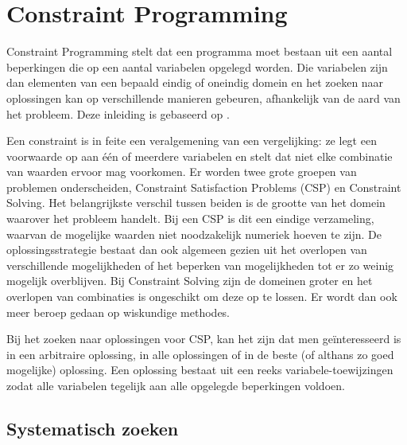 \section{Constraint Programming}

Constraint Programming stelt dat een programma moet bestaan uit een aantal beperkingen die op een aantal variabelen opgelegd worden. Die variabelen zijn dan elementen van een bepaald eindig of oneindig domein en het zoeken naar oplossingen kan op verschillende manieren gebeuren, afhankelijk van de aard van het probleem. Deze inleiding is gebaseerd op \cite{bartak99constraint}.

Een constraint is in feite een veralgemening van een vergelijking: ze legt een voorwaarde op aan \'e\'en of meerdere variabelen en stelt dat niet elke combinatie van waarden ervoor mag voorkomen. Er worden twee grote groepen van problemen onderscheiden, Constraint Satisfaction Problems (CSP) en Constraint Solving. Het belangrijkste verschil tussen beiden is de grootte van het domein waarover het probleem handelt. Bij een CSP is dit een eindige verzameling, waarvan de mogelijke waarden niet noodzakelijk numeriek hoeven te zijn. De oplossingsstrategie bestaat dan ook algemeen gezien uit het overlopen van verschillende mogelijkheden of het beperken van mogelijkheden tot er zo weinig mogelijk overblijven. Bij Constraint Solving zijn de domeinen groter en het overlopen van combinaties is ongeschikt om deze op te lossen. Er wordt dan ook meer beroep gedaan op wiskundige methodes.

Bij het zoeken naar oplossingen voor CSP, kan het zijn dat men ge\"interesseerd is in een arbitraire oplossing, in alle oplossingen of in de beste (of althans zo goed mogelijke) oplossing. Een oplossing bestaat uit een reeks variabele-toewijzingen zodat alle variabelen tegelijk aan alle opgelegde beperkingen voldoen.

\subsection{Systematisch zoeken}

